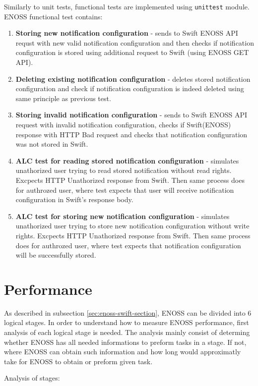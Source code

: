     Similarly to unit tests, functional tests are implemented using \texttt{unittest} module. ENOSS functional test contains:
    \begin{enumerate}
        \item \textbf{Storing new notification configuration} - sends to Swift ENOSS API requst with new valid notification configuration and then checks if notification configuration is stored using additional request to Swift (using ENOSS GET API).
        \item \textbf{Deleting existing notification configuration} - deletes stored notification configuration and check if notification configuration is indeed deleted using same principle as previous test.
        \item \textbf{Storing invalid notification configuration} - sends to Swift ENOSS API request with invalid notification configuration, checks if Swift(ENOSS) response with HTTP Bad request and checks that notification configuration was not stored in Swift.
        \item \textbf{ALC test for reading stored notification configuration} - simulates unathorized user trying to read stored notification without read rights. Excpects HTTP Unathorized response from Swift. Then same process does for authrozed user, where test expects that user will receive notification configuration in Swift's response body.
        \item \textbf{ALC test for storing new notification configuration} - simulates unathorized user trying to store new notification configuration without write rights. Excpects HTTP Unathorized response from Swift. Then same process does for authrozed user, where test expects that notification configuration will be successfully stored.
    \end{enumerate}
\section{Performance}
    As described in subsection \ref{sec:enoss-swift-section}, ENOSS can be divided into 6 logical stages. In order to understand how to measure ENOSS performance, first analysis of each logical stage is needed. The analysis mainly consist of determing whether ENOSS has all needed informations to preform tasks in a stage. If not, where ENOSS can obtain such information and how long would approximatly take for ENOSS to obtain or preform given task.

    Analysis of stages:

